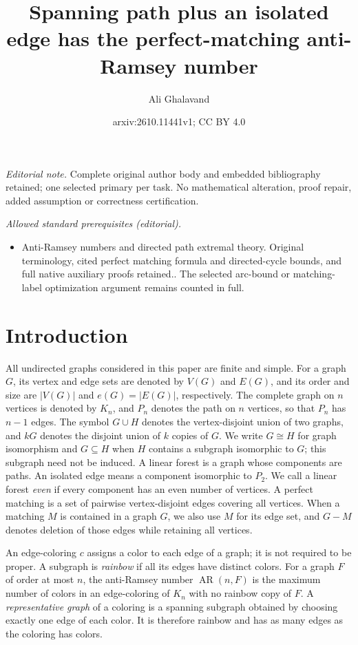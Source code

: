 \documentclass[10pt,a4paper]{article}
\title{Spanning path plus an isolated edge has the perfect-matching anti-Ramsey number}
\author{Ali Ghalavand}
\date{arxiv:2610.11441v1; CC BY 4.0}
\DeclareMathOperator{\AR}{AR}
\begin{document}
\maketitle
\noindent\textit{Editorial note.} Complete original author body and embedded bibliography retained; one selected primary per task. No mathematical alteration, proof repair, added assumption or correctness certification.\par\medskip
\noindent\textit{Allowed standard prerequisites (editorial).}\begin{itemize}
\item Anti-Ramsey numbers and directed path extremal theory. Original terminology, cited perfect matching formula and directed-cycle bounds, and full native auxiliary proofs retained.. The selected arc-bound or matching-label optimization argument remains counted in full.
\end{itemize}\medskip
\section{Introduction}

All undirected graphs considered in this paper are finite and simple.
For a graph $G$, its vertex and edge sets are denoted by $V(G)$ and $E(G)$,
and its order and size are $|V(G)|$ and $e(G)=|E(G)|$, respectively.
The complete graph on $n$ vertices is denoted by $K_n$, and $P_n$ denotes
the path on $n$ vertices, so that $P_n$ has $n-1$ edges.
The symbol $G\cup H$ denotes the vertex-disjoint union of two graphs,
and $kG$ denotes the disjoint union of $k$ copies of $G$.
We write $G\cong H$ for graph isomorphism and $G\subseteq H$ when $H$
contains a subgraph isomorphic to $G$; this subgraph need not be induced.
A linear forest is a graph whose components are paths. An isolated edge
means a component isomorphic to $P_2$. We call a linear forest \emph{even} if every
component has an even number of vertices. A perfect matching is a set of
pairwise vertex-disjoint edges covering all vertices. When a matching $M$ is contained in
a graph $G$, we also use $M$ for its edge set, and $G-M$ denotes deletion
of those edges while retaining all vertices.

An edge-coloring $c$ assigns a color to each edge of a graph; it is not
required to be proper. A subgraph is \emph{rainbow} if all its edges have
distinct colors. For a graph $F$ of order at most $n$, the anti-Ramsey number
$\AR(n,F)$ is the maximum number of colors in an edge-coloring of $K_n$
with no rainbow copy of $F$. A \emph{representative graph} of a coloring is a spanning subgraph obtained
by choosing exactly one edge of each color. It is therefore rainbow and
has as many edges as the coloring has colors.
\end{document}
